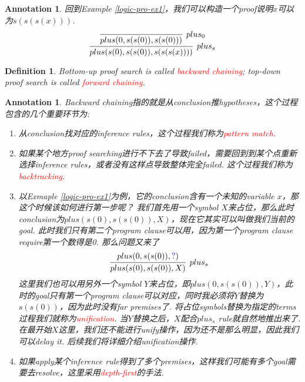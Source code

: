 \documentclass{article}
\theoremstyle{plain}
\newtheorem{definition}[theorem]{Definition}
\newtheorem{annotation}[theorem]{Annotation}
\theoremstyle{nonumberplain}
\newcommand{\redt}[1]{\textcolor{red}{#1}}
\newcommand{\bluet}[1]{\textcolor{blue}{#1}}
\begin{document}
\begin{annotation}
\rm 回到Example \ref{logic-pro-ex1}，我们可以构造一个proof说明$x$可以为$s(s(s(x)))$.
$$
\infer[plus_s]{plus(s(0),s(s(0)),s(s(s(x))))}{\infer[plus_0]{plus(0,s(s(0)),s(s(0)))}{}}
$$
\end{annotation}

\begin{definition}
\rm Bottom-up proof search is called \redt{backward chaining}; top-down proof search is called \redt{forward chaining}.
\end{definition}

\begin{annotation}
\rm Backward chaining指的就是从conclusion推hypotheses，这个过程包含的几个重要环节为: 
\begin{enumerate}
	\item 从conclusion找对应的inference rules，这个过程我们称为\redt{pattern match}.
	\item 如果某个地方proof searching进行不下去了导致failed，需要回到到某个点重新选择inference rules，或者没有这样点导致整体完全failed. 这个过程我们称为\redt{backtracking}.
	\item 以Exmaple \ref{logic-pro-ex1}为例，它的conclusion含有一个未知的variable $x$，那这个时候该如何进行第一步呢？ 我们首先用一个symbol $X$来占位，那么此时conclusion为$plus(s(0),s(s(0)), X)$，现在它其实可以叫做我们当前的goal. 此时我们只有第二个program clause可以用，因为第一个program clause require第一个数得是0. 那么问题又来了
	$$
	\infer[plus_s]{plus(s(0),s(s(0)), X)}{plus(0,s(s(0)), \bluet{?})}
	$$
	这里我们也可以用另外一个symbol $Y$来占位，即$plus(0,s(s(0)), Y)$，此时的goal只有第一个program clause可以对应，同时我必须将$Y$替换为$s(s(0))$，因为此时没有far premises了. 将占位symbols替换为指定的terms过程我们就称为\redt{unification}. 当$Y$替换之后，$X$配合$plus_s$ rule就自然地推出来了. 在最开始$X$这里，我们还不能进行unify操作，因为还不是那么明显，因此我们可以delay it. 后续我们将详细介绍unification操作. 
	\item 如果apply某个inference rule得到了多个premises，这样我们可能有多个goal需要去resolve，这里采用\redt{depth-first}的手法.    
\end{enumerate}
\end{annotation}
\end{document}
